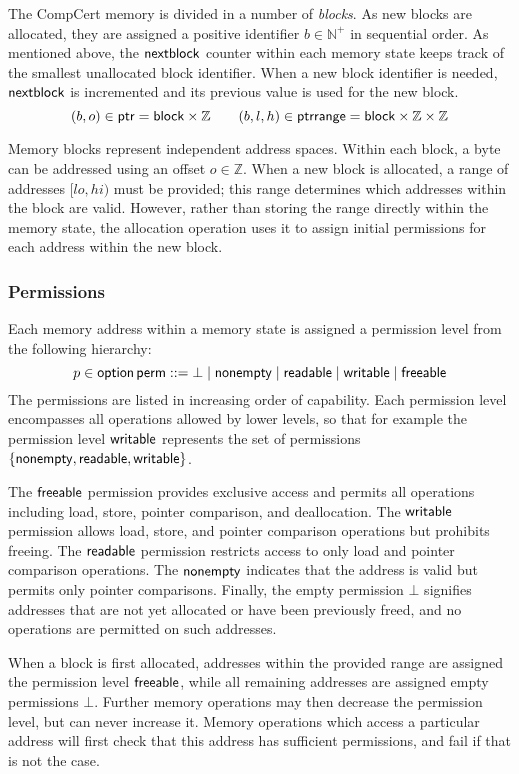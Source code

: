 The CompCert memory is divided in a number of \emph{blocks}.
As new blocks are allocated,
they are assigned a positive identifier $b \in \mathbb{N}^+$
in sequential order.
As mentioned above,
the $ \mathsf{nextblock} $ counter within each memory state
keeps track of the smallest unallocated block identifier.
When a new block identifier is needed,
$ \mathsf{nextblock} $ is incremented and its previous value
is used for the new block.
\[
  (b, o) \in  \mathsf{ptr}  =  \mathsf{block}  \times \mathbb{Z}
  \qquad
  (b, l, h) \in  \mathsf{ptrrange}  =  \mathsf{block}  \times \mathbb{Z} \times \mathbb{Z}
\]

Memory blocks represent independent address spaces.
Within each block,
a byte can be addressed using an offset $o \in \mathbb{Z}$.
When a new block is allocated,
a range of addresses $[\mathit{lo}, \mathit{hi})$ must be provided;
this range determines which addresses within the block are valid.
However,
rather than storing the range directly within the memory state,
the allocation operation uses it to assign initial permissions
for each address within the new block.

\subsubsection{Permissions}

Each memory address within a memory state
is assigned a permission level from the following hierarchy:
\[
  p \in  \mathsf{option} \, \mathsf{perm}  ::=
  \bot \mid
   \mathsf{nonempty}  \mid
   \mathsf{readable}  \mid
   \mathsf{writable}  \mid
   \mathsf{freeable} 
\]
The permissions are listed in increasing order of capability.
Each permission level encompasses
all operations allowed by lower levels,
so that for example the permission level $ \mathsf{writable} $
represents the set of permissions
$\{  \mathsf{nonempty} ,  \mathsf{readable} ,  \mathsf{writable}  \}$.

The $ \mathsf{freeable} $ permission provides
exclusive access
and permits all operations
including load, store, pointer comparison, and deallocation.
The $ \mathsf{writable} $
permission allows load, store, and pointer comparison operations
but prohibits freeing.
The $ \mathsf{readable} $
permission restricts access to only load and
pointer comparison operations.
The $ \mathsf{nonempty} $
indicates that the address is valid but permits only pointer comparisons.
Finally, the empty permission $\bot$
signifies addresses that are not yet allocated or have been previously freed, and no operations are permitted on such addresses.

When a block is first allocated,
addresses within the provided range
are assigned the permission level $ \mathsf{freeable} $,
while all remaining addresses are assigned
empty permissions $\bot$.
Further memory operations may then decrease the permission level,
but can never increase it.
Memory operations which access a particular address
will first check that this address has sufficient permissions,
and fail if that is not the case.

